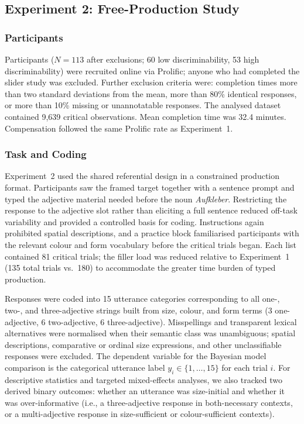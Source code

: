 \documentclass[man,floatsintext]{apa7}
\begin{document}
\subsection{Experiment 2: Free-Production Study}
\label{sec:exp:production}

\subsubsection{Participants}

Participants ($N = 113$ after exclusions; 60 low discriminability, 53 high discriminability) were recruited online via Prolific; anyone who had completed the slider study was excluded.
Further exclusion criteria were: completion times more than two standard deviations from the mean, more than 80\% identical responses, or more than 10\% missing or unannotatable responses.
The analysed dataset contained 9{,}639 critical observations.
Mean completion time was 32.4 minutes.
Compensation followed the same Prolific rate as Experiment~1.
\subsubsection{Task and Coding}

Experiment~2 used the shared referential design in a constrained production format.
Participants saw the framed target together with a sentence prompt and typed the adjective material needed before the noun \textit{Aufkleber}.
Restricting the response to the adjective slot rather than eliciting a full sentence reduced off-task variability and provided a controlled basis for coding.
Instructions again prohibited spatial descriptions, and a practice block familiarised participants with the relevant colour and form vocabulary before the critical trials began.
Each list contained 81 critical trials; the filler load was reduced relative to Experiment~1 (135 total trials vs.\ 180) to accommodate the greater time burden of typed production.

Responses were coded into 15 utterance categories corresponding to all one-, two-, and three-adjective strings built from size, colour, and form terms (3 one-adjective, 6 two-adjective, 6 three-adjective).
Misspellings and transparent lexical alternatives were normalised when their semantic class was unambiguous; spatial descriptions, comparative or ordinal size expressions, and other unclassifiable responses were excluded.
The dependent variable for the Bayesian model comparison is the categorical utterance label $y_i \in \{1, \ldots, 15\}$ for each trial $i$.
For descriptive statistics and targeted mixed-effects analyses, we also tracked two derived binary outcomes: whether an utterance was size-initial and whether it was over-informative (i.e., a three-adjective response in both-necessary contexts, or a multi-adjective response in size-sufficient or colour-sufficient contexts).
\end{document}
